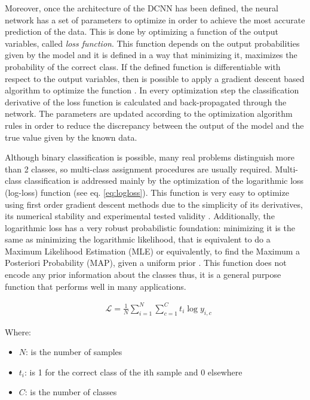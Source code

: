 \documentclass[times,twocolumn,final,authoryear]{elsarticle}
\begin{document}
Moreover, once the architecture of the DCNN has been defined, the neural network has a set of parameters to optimize in order to achieve the most accurate prediction of the data. This is done by optimizing a function of the output variables, called \textit{loss function}. This function depends on the output probabilities given by the model and it is defined in a way that minimizing it, maximizes the probability of the correct class. If the defined function is differentiable with respect to the output variables, then is possible to apply a gradient descent based algorithm to optimize the function \citep{saad1998online}. In every optimization step the classification derivative of the loss function is calculated and back-propagated through the network. The parameters are updated according to the optimization algorithm rules in order to reduce the discrepancy between the output of the model and the true value given by the known data.

Although binary classification is possible, many real problems distinguish more than 2 classes, so multi-class assignment procedures are usually required.
Multi-class classification is addressed mainly by the optimization of the logarithmic loss (log-loss) function (see eq. \ref{eq:logloss}). This function is very easy to optimize using first order gradient descent methods due to the simplicity of its derivatives, its numerical stability and experimental tested validity \citep{Goodfellow-et-al-2016}. Additionally, the logarithmic loss has a very robust probabilistic foundation: minimizing it is the same as minimizing the logarithmic likelihood, that is equivalent to do a Maximum Likelihood Estimation (MLE) or equivalently, to find the Maximum a Posteriori Probability (MAP), given a uniform prior \citep{Murphy:2012:MLP:2380985}. This function does not encode any prior information about the classes thus, it is a general purpose function that performs well in many applications. 

\begin{equation}
\begin{aligned}
\label{eq:logloss}
&\mathcal{L} = \frac{1}{N} \sum_{i=1}^N \sum_{c=1}^C t_i \log{y_{i,c}}
\end{aligned}
\end{equation}

Where:
\begin{itemize}
	\item[] $N$: is the number of samples
	\item[] $t_i$: is 1 for the correct class of the ith sample and 0 elsewhere
	\item[] $C$: is the number of classes
\end{itemize}
\end{document}
